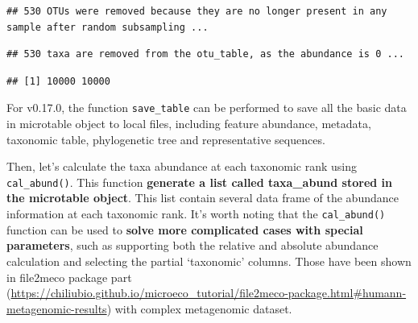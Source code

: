 \documentclass[
]{book}
\newenvironment{Shaded}{\begin{snugshade}}{\end{snugshade}}
\newcommand{\AttributeTok}[1]{\textcolor[rgb]{0.77,0.63,0.00}{#1}}
\newcommand{\CommentTok}[1]{\textcolor[rgb]{0.56,0.35,0.01}{\textit{#1}}}
\newcommand{\DecValTok}[1]{\textcolor[rgb]{0.00,0.00,0.81}{#1}}
\newcommand{\FunctionTok}[1]{\textcolor[rgb]{0.00,0.00,0.00}{#1}}
\newcommand{\NormalTok}[1]{#1}
\newcommand{\SpecialCharTok}[1]{\textcolor[rgb]{0.00,0.00,0.00}{#1}}
\newcommand{\StringTok}[1]{\textcolor[rgb]{0.31,0.60,0.02}{#1}}
\begin{document}
\begin{Shaded}
\end{Shaded}

\begin{verbatim}
## 530 OTUs were removed because they are no longer present in any sample after random subsampling ...
\end{verbatim}

\begin{verbatim}
## 530 taxa are removed from the otu_table, as the abundance is 0 ...
\end{verbatim}

\begin{Shaded}
\end{Shaded}

\begin{verbatim}
## [1] 10000 10000
\end{verbatim}

For v0.17.0, the function \texttt{save\_table} can be performed to save all the basic data in microtable object to local files,
including feature abundance, metadata, taxonomic table, phylogenetic tree and representative sequences.

\begin{Shaded}
\end{Shaded}

Then, let's calculate the taxa abundance at each taxonomic rank using \texttt{cal\_abund()}.
This function \textbf{generate a list called taxa\_abund stored in the microtable object}.
This list contain several data frame of the abundance information at each taxonomic rank.
It's worth noting that the \texttt{cal\_abund()} function can be used to \textbf{solve more complicated cases with special parameters},
such as supporting both the relative and absolute abundance calculation and selecting the partial `taxonomic' columns.
Those have been shown in file2meco package part (\url{https://chiliubio.github.io/microeco_tutorial/file2meco-package.html\#humann-metagenomic-results}) with complex metagenomic dataset.
\end{document}
